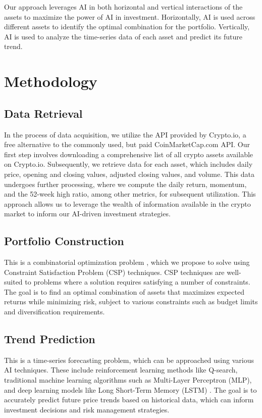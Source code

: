 \documentclass[journal, onecolumn]{IEEEtran}
\begin{document}
Our approach leverages AI in both horizontal and vertical interactions of the assets to maximize the power of AI in investment. Horizontally, AI is used across different assets to identify the optimal combination for the portfolio. Vertically, AI is used to analyze the time-series data of each asset and predict its future trend.

\section{Methodology}
\subsection{Data Retrieval}
In the process of data acquisition, we utilize the API provided by Crypto.io, a free alternative to the commonly used, but paid CoinMarketCap.com API. Our first step involves downloading a comprehensive list of all crypto assets available on Crypto.io. Subsequently, we retrieve data for each asset, which includes daily price, opening and closing values, adjusted closing values, and volume. This data undergoes further processing, where we compute the daily return, momentum, and the 52-week high ratio, among other metrics, for subsequent utilization. This approach allows us to leverage the wealth of information available in the crypto market to inform our AI-driven investment strategies.

\subsection{Portfolio Construction}
This is a combinatorial optimization problem \cite{lim2022dynamic, bartram2020artificial, chan2002artificial, gunjan2023brief}, which we propose to solve using Constraint Satisfaction Problem (CSP) techniques. CSP techniques are well-suited to problems where a solution requires satisfying a number of constraints. The goal is to find an optimal combination of assets that maximizes expected returns while minimizing risk, subject to various constraints such as budget limits and diversification requirements.

\subsection{Trend Prediction}
This is a time-series forecasting problem, which can be approached using various AI techniques. These include reinforcement learning methods like Q-search, traditional machine learning algorithms such as Multi-Layer Perceptron (MLP), and deep learning models like Long Short-Term Memory (LSTM) \cite{10007138, 10356083, oshingbesan2022modelfree, zhang2022deep, chen2023deep, hansun2022multivariate, gupta2024forecasting}. The goal is to accurately predict future price trends based on historical data, which can inform investment decisions and risk management strategies.
\end{document}
